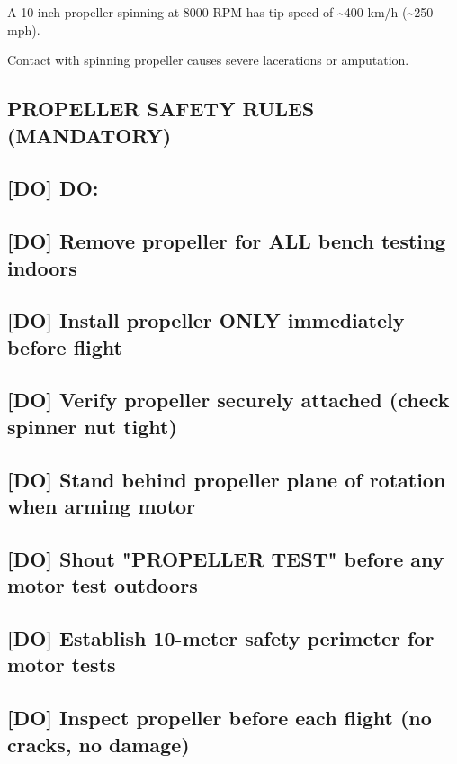 \documentclass[11pt,letterpaper]{article}
\begin{document}
A 10-inch propeller spinning at 8000 RPM has tip speed of \textasciitilde{}400 km/h (\textasciitilde{}250 mph).\par

Contact with spinning propeller causes severe lacerations or amputation.\par

\subsection*{PROPELLER SAFETY RULES (MANDATORY)}

\subsection*{[DO] DO:}

\subsection*{[DO] Remove propeller for ALL bench testing indoors}

\subsection*{[DO] Install propeller ONLY immediately before flight}

\subsection*{[DO] Verify propeller securely attached (check spinner nut tight)}

\subsection*{[DO] Stand behind propeller plane of rotation when arming motor}

\subsection*{[DO] Shout "PROPELLER TEST" before any motor test outdoors}

\subsection*{[DO] Establish 10-meter safety perimeter for motor tests}

\subsection*{[DO] Inspect propeller before each flight (no cracks, no damage)}
\end{document}
